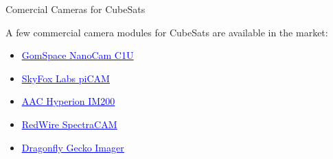 %
%
%
%
%

%
%
%
%
%


\begin{frame}{Comercial Cameras for CubeSats}

    A few commercial camera modules for CubeSats are available in the market:

    \begin{itemize}
        \item \href{https://gomspace.com/shop/payloads/earth-observation.aspx}{\textcolor{blue}{\underline{GomSpace NanoCam C1U}}}
        \vspace{0.4cm}
        \item \href{https://www.skyfoxlabs.com/product/27-digital-cubesat-camera}{\textcolor{blue}{\underline{SkyFox Labs piCAM}}}
        \vspace{0.4cm}
        \item \href{https://www.aac-clyde.space/what-we-do/space-products-components/payloads/im200}{\textcolor{blue}{\underline{AAC Hyperion IM200}}}
        \vspace{0.4cm}
        \item \href{https://redwirespace.com/products/spectracam}{\textcolor{blue}{\underline{RedWire SpectraCAM}}}
        \vspace{0.4cm}
        \item \href{https://dragonflyaerospace.com/products/gecko/}{\textcolor{blue}{\underline{Dragonfly Gecko Imager}}}
    \end{itemize}

\end{frame}


